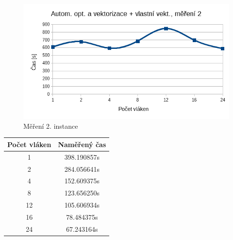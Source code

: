 \documentclass[12pt]{article}
\begin{document}
\begin{figure}[H]
  \begin{center}
      \includegraphics[width=12cm]{images/ssef2.png}
    \caption{Měření 2. instance} 
  \end{center}
\end{figure}
%
%
\begin{center}
\begin{tabular}{ c | c }
\textbf{Počet vláken} & \textbf{Naměřený čas} \\ \hline \hline 
1 & 398.190857s \\ \hline
2 & 284.056641s \\ \hline
4 & 152.609375s \\ \hline
8 & 123.656250s \\ \hline
12 & 105.606934s \\ \hline
16 & 78.484375s \\ \hline
24 & 67.243164s \\ \hline
\end{tabular}
\end{center}
\end{document}

